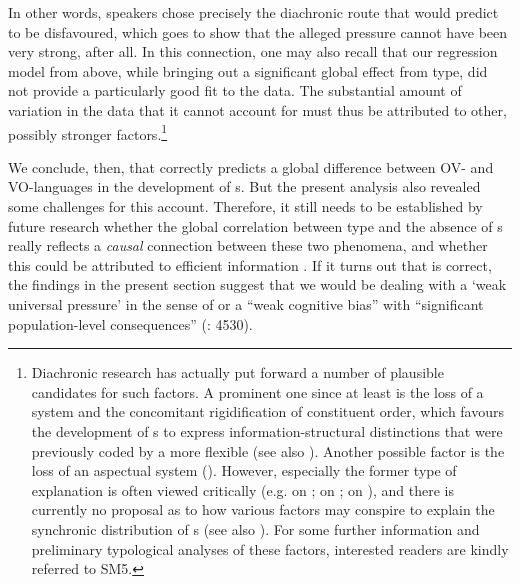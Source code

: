 \documentclass[output=paper]{langsci/langscibook}
\begin{document}
In other words,  speakers chose precisely the diachronic route that  would predict to be disfavoured, which goes to show that the alleged  pressure cannot have been very strong, after all. In this connection, one may also recall that our regression model from above, while bringing out a significant global effect from  type, did not provide a particularly good fit to the data. The substantial amount of variation in the data that it cannot account for must thus be attributed to other, possibly stronger factors.\footnote{Diachronic research has actually put forward a number of plausible candidates for such factors. A prominent one since at least \citet{Vennemann1975_Drift} is the loss of a  system and the concomitant rigidification of constituent order, which favours the development of s to express information-structural distinctions that were previously coded by a more flexible  (see also \citealt{Hawkins2004_Eff,HewsonBubenik2006,Fischer2010_WOChange,CarlierLamiroy2014}). Another possible factor is the loss of an aspectual system (\citealt{Abraham1997_Asp,Leiss2000_Asp,Leiss2007_Def}). However, especially the former type of explanation is often viewed critically (e.g. \citealt{Selig1992_LatDet} on ; \citealt{McCollMillar2000_Def} on ; \citealt{Leiss2000_Asp} on ), and there is currently no proposal as to how various factors may conspire to explain the synchronic distribution of s (see also \citealt{Lüdtke1991}). For some further information and preliminary typological analyses of these factors, interested readers are kindly referred to SM5.}

We conclude, then, that \citet{Hawkins2014_VarEff} correctly predicts a global difference between OV- and VO-languages in the development of s. But the present analysis also revealed some challenges for this account. Therefore, it still needs to be established by future research whether the global correlation between  type and the absence of s really reflects a \textit{causal} connection between these two phenomena, and whether this could be attributed to efficient information . If it turns out that  is correct, the findings in the present section suggest that we would be dealing with a ‘weak universal pressure’ in the sense of  or a “weak cognitive bias” with “significant population-level consequences” (\citealt{ThompsonEtAl2016}: 4530).
\end{document}
